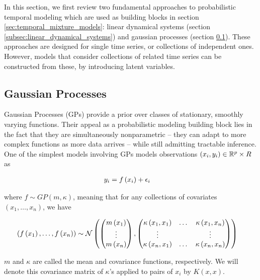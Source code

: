\documentclass[14pt]{extreport}
\begin{document}
In this section, we first review two fundamental approaches to probabilistic
temporal modeling which are used as building blocks in section
\ref{sec:temporal_mixture_models}: linear dynamical systems (section
\ref{subsec:linear_dynamical_systems}) and gaussian processes (section
\ref{subsec:gaussian_processes}). These approaches are designed for single time
series, or collections of independent ones. However, models that consider
collections of related time series can be constructed from these, by introducing
latent variables.

\subsection{Gaussian Processes}
\label{subsec:gaussian_processes}

Gaussian Processes (GPs) provide a prior over classes of stationary, smoothly
varying functions. Their appeal as a probabilistic modeling building block lies
in the fact that they are simultaneously nonparametric -- they can adapt to more
complex functions as more data arrives -- while still admitting tractable
inference. One of the simplest models involving GPs models observations
$\left(x_{i}, y_{i}\right) \in \mathbb{R}^{p}\times R$ as

\begin{align*}
y_{i} &= f\left(x_{i}\right) + \epsilon_{i}
\end{align*}

where $f \sim GP\left(m, \kappa\right)$, meaning that for any collections of
covariates $\left(x_{1}, \dots, x_{n}\right)$, we have

\begin{align*}
  \left(f\left(x_{1}\right), \dots, f\left(x_{n}\right)\right) &\sim
  \mathcal{N}\left( \begin{pmatrix} m\left(x_{1}\right) \\ \vdots \\ m\left(x_{n}\right) \end{pmatrix}, \begin{pmatrix} \kappa\left(x_{1}, x_{1}\right) & \dots & \kappa\left(x_{1}, x_{n}\right) \\ \vdots & & \vdots \\ \kappa\left(x_{n}, x_{1}\right) & \dots &\kappa\left(x_{n}, x_{n}\right) \end{pmatrix}\right)
\end{align*}

$m$ and $\kappa$ are called the mean and covariance functions, respectively. We
will denote this covariance matrix of $\kappa$'s applied to pairs of $x_{i}$ by
$K\left(x, x\right)$.
\end{document}
